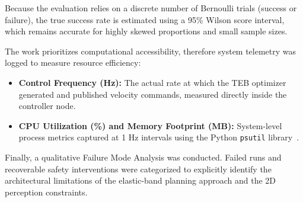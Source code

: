 Because the evaluation relies on a discrete number of Bernoulli trials (success or failure), the true success rate is estimated using a 95\% Wilson score interval, which remains accurate for highly skewed proportions and small sample sizes.

The work prioritizes computational accessibility, therefore system telemetry was logged to measure resource efficiency:
\begin{itemize}
    \item \textbf{Control Frequency (Hz):} The actual rate at which the TEB optimizer generated and published velocity commands, measured directly inside the controller node.
    \item \textbf{CPU Utilization (\%) and Memory Footprint (MB):} System-level process metrics captured at 1 Hz intervals using the Python \texttt{psutil} library~\cite{psutil}.
\end{itemize}

Finally, a qualitative Failure Mode Analysis was conducted. Failed runs and recoverable safety interventions were categorized to explicitly identify the architectural limitations of the elastic-band planning approach and the 2D perception constraints.
